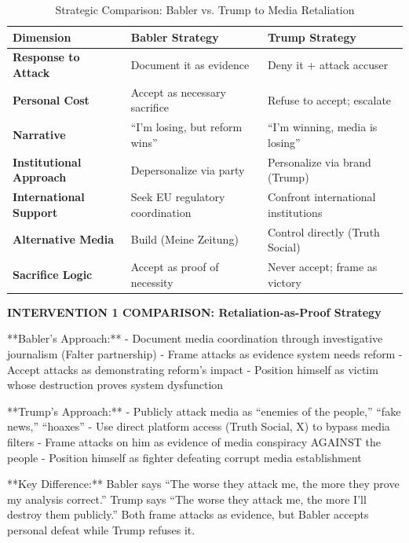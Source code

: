 \begin{table}[h]
\centering
\caption{Strategic Comparison: Babler vs. Trump to Media Retaliation}
\label{tab:dx-babler-trump-comparison}
\begin{tabular}{|l|l|l|}
\hline
\textbf{Dimension} & \textbf{Babler Strategy} & \textbf{Trump Strategy} \\
\hline
\textbf{Response to Attack} & Document it as evidence & Deny it + attack accuser \\
\hline
\textbf{Personal Cost} & Accept as necessary sacrifice & Refuse to accept; escalate \\
\hline
\textbf{Narrative} & ``I'm losing, but reform wins'' & ``I'm winning, media is losing'' \\
\hline
\textbf{Institutional Approach} & Depersonalize via party & Personalize via brand (Trump) \\
\hline
\textbf{International Support} & Seek EU regulatory coordination & Confront international institutions \\
\hline
\textbf{Alternative Media} & Build (Meine Zeitung) & Control directly (Truth Social) \\
\hline
\textbf{Sacrifice Logic} & Accept as proof of necessity & Never accept; frame as victory \\
\hline
\end{tabular}
\end{table}

\vspace{0.5cm}

\textbf{INTERVENTION 1 COMPARISON: Retaliation-as-Proof Strategy}

**Babler's Approach:**
- Document media coordination through investigative journalism (Falter partnership)
- Frame attacks as evidence system needs reform
- Accept attacks as demonstrating reform's impact
- Position himself as victim whose destruction proves system dysfunction

**Trump's Approach:**
- Publicly attack media as ``enemies of the people,'' ``fake news,'' ``hoaxes''
- Use direct platform access (Truth Social, X) to bypass media filters
- Frame attacks on him as evidence of media conspiracy AGAINST the people
- Position himself as fighter defeating corrupt media establishment

**Key Difference:** Babler says ``The worse they attack me, the more they prove my analysis correct.'' Trump says
``The worse they attack me, the more I'll destroy them publicly.'' Both frame attacks as evidence, but Babler accepts
personal defeat while Trump refuses it.

